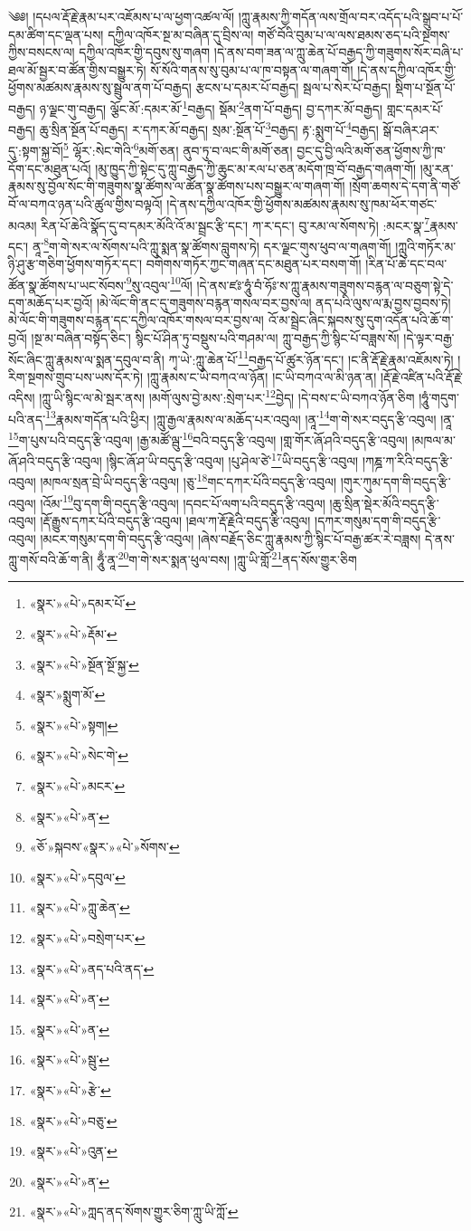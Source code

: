 ༄༅། །དཔལ་རྡོ་རྗེ་རྣམ་པར་འཇོམས་པ་ལ་ཕྱག་འཚལ་ལོ། །ཀླུ་རྣམས་ཀྱི་གདོན་ལས་གྲོལ་བར་འདོད་པའི་སྒྲུབ་པ་པོ་དམ་ཚིག་དང་ལྡན་པས། དཀྱིལ་འཁོར་སྔ་མ་བཞིན་དུ་བྲིས་ལ། གཙོ་བོའི་བུམ་པ་ལ་ལས་ཐམས་ཅད་པའི་སྔགས་ཀྱིས་བསངས་ལ། དཀྱིལ་འཁོར་གྱི་དབུས་སུ་གཞག །དེ་ནས་བག་ཟན་ལ་ཀླུ་ཆེན་པོ་བརྒྱད་ཀྱི་གཟུགས་སོར་བཞི་པ་ཐལ་མོ་སྦྱར་བ་ཚོན་གྱིས་བསྒྱུར་ཏེ། སོ་སོའི་གནས་སུ་བུམ་པ་ལ་ཁ་བསྟན་ལ་གཞག་གོ། །དེ་ནས་དཀྱིལ་འཁོར་གྱི་ཕྱོགས་མཚམས་རྣམས་སུ་སྦྲུལ་ནག་པོ་བརྒྱད། རྩངས་པ་དམར་པོ་བརྒྱད། སྦལ་པ་སེར་པོ་བརྒྱད། སྡིག་པ་སྔོན་པོ་བརྒྱད། ཉ་ལྗང་གུ་བརྒྱད། ལྕོང་མོ་:དམར་མོ་\footnote{«སྣར་»«པེ་»དམར་པོ་}བརྒྱད། སྡོམ་\footnote{«སྣར་»«པེ་»རྡོམ་}ནག་པོ་བརྒྱད། བྱ་དཀར་མོ་བརྒྱད། གླང་དམར་པོ་བརྒྱད། ཆུ་སྲིན་སྔོན་པོ་བརྒྱད། ར་དཀར་མོ་བརྒྱད། སྲམ་:སྔོན་པོ་\footnote{«སྣར་»«པེ་»སྔོན་སྔོ་སྐྱ་}བརྒྱད། རྟ་:སྨུག་པོ་\footnote{«སྣར་»སྨུག་མོ་}བརྒྱད། སྒོ་བཞིར་ཤར་དུ་:སྟག་སྐྱ་བོ།\footnote{«སྣར་»«པེ་»སྟག།} ལྷོར་:སེང་གེའི་\footnote{«སྣར་»«པེ་»སེང་གེ་}མགོ་ཅན། ནུབ་ཏུ་བ་ལང་གི་མགོ་ཅན། བྱང་དུ་བྱི་ལའི་མགོ་ཅན་ཕྱོགས་ཀྱི་ཁ་དོག་དང་མཐུན་པའོ། །མུ་ཁྱུད་ཀྱི་སྟེང་དུ་ཀླུ་བརྒྱད་ཀྱི་ཆུང་མ་རལ་པ་ཅན་མདོག་ཁྲ་བོ་བརྒྱད་གཞག་གོ། །མུ་རན་རྣམས་སུ་བྱོལ་སོང་གི་གཟུགས་སྣ་ཚོགས་ལ་ཚོན་སྣ་ཚོགས་པས་བསྒྱུར་ལ་གཞག་གོ། །སྲོག་ཆགས་དེ་དག་ནི་གཙོ་བོ་ལ་བཀའ་ཉན་པའི་ཚུལ་གྱིས་བལྟའོ། །དེ་ནས་དཀྱིལ་འཁོར་གྱི་ཕྱོགས་མཚམས་རྣམས་སུ་ཁམ་ཕོར་གཙང་མའམ། རིན་པོ་ཆེའི་སྣོད་དུ་བ་དམར་མོའི་འོ་མ་སྦྲང་རྩི་དང་། ཀ་ར་དང་། བུ་རམ་ལ་སོགས་ཏེ། :མངར་སྣ་\footnote{«སྣར་»«པེ་»མངར་}རྣམས་དང་། ནཱ་\footnote{«སྣར་»«པེ་»ན་}ག་གེ་སར་ལ་སོགས་པའི་ཀླུ་སྨན་སྣ་ཚོགས་བླུགས་ཏེ། དར་ལྗང་གུས་ཕུབ་ལ་གཞག་གོ། །ཀླུའི་གཏོར་མ་ཉི་ཤུ་རྩ་གཅིག་ཕྱོགས་གཏོར་དང་། བགེགས་གཏོར་ཀྱང་གཞན་དང་མཐུན་པར་བསག་གོ། །རིན་པོ་ཆེ་དང་བལ་ཚོན་སྣ་ཚོགས་པ་ཡང་སོབས་\footnote{«ཅོ་»སྐབས་«སྣར་»«པེ་»སོགས་}སུ་འབུལ་\footnote{«སྣར་»«པེ་»དབུལ་}ལོ། །དེ་ནས་ཛཿ་ཧཱུཾ་བཾ་ཧོཿ་ས་ཀླུ་རྣམས་གཟུགས་བརྙན་ལ་བཅུག་སྟེ་དེ་དག་མཆོད་པར་བྱའོ། །མེ་ལོང་གི་ནང་དུ་གཟུགས་བརྙན་གསལ་བར་བྱས་ལ། ནད་པའི་ལུས་ལ་རྨ་བྱས་བྱབས་ཏེ། མེ་ལོང་གི་གཟུགས་བརྙན་དང་དཀྱིལ་འཁོར་གསལ་བར་བྱས་ལ། འོ་མ་སྦྲེང་ཞིང་སྐབས་སུ་དུག་འདོན་པའི་ཆོ་ག་བྱའོ། །སྔ་མ་བཞིན་བསྟོད་ཅིང་། སྙིང་པོ་ཤིན་ཏུ་བསྡུས་པའི་གཤམ་ལ། ཀླུ་བརྒྱད་ཀྱི་སྙིང་པོ་བཟླས་སོ། །དེ་ལྟར་བརྒྱ་སོང་ཞིང་ཀླུ་རྣམས་ལ་སྨན་དབུལ་བ་ནི། ཀྭ་ཡེ་:ཀླུ་ཆེན་པོ་\footnote{«སྣར་»«པེ་»ཀླུ་ཆེན་}བརྒྱད་པོ་ཚུར་ཉོན་དང་། །ང་ནི་རྡོ་རྗེ་རྣམ་འཇོམས་ཏེ། །རིག་སྔགས་གྲུབ་པས་ཡས་དོར་ཏེ། །ཀླུ་རྣམས་ང་ཡི་བཀའ་ལ་ཉོན། །ང་ཡི་བཀའ་ལ་མི་ཉན་ན། །རྡོ་རྗེ་འཛིན་པའི་རྡོ་རྗེ་འདིས། །ཀླུ་ཡི་སྙིང་ལ་མེ་སྦར་ནས། །མགོ་ལུས་བྱེ་མས་:སྲེག་པར་\footnote{«སྣར་»«པེ་»བསྲེག་པར་}བྱེད། །དེ་བས་ང་ཡི་བཀའ་ཉོན་ཅིག །ཧཱུཾ་གདུག་པའི་ནད་\footnote{«སྣར་»«པེ་»ནད་པའི་ནད་}རྣམས་གདོན་པའི་ཕྱིར། །ཀླུ་རྒྱལ་རྣམས་ལ་མཆོད་པར་འབུལ། །ནཱ་\footnote{«སྣར་»«པེ་»ན་}ག་གེ་སར་བདུད་རྩི་འབུལ། །ནཱ་\footnote{«སྣར་»«པེ་»ན་}ག་པུས་པའི་བདུད་རྩི་འབུལ། །རྒྱ་མཚོ་ལྦུ་\footnote{«སྣར་»«པེ་»སྦུ་}བའི་བདུད་རྩི་འབུལ། །གླ་གོར་ཞོ་ཤའི་བདུད་རྩི་འབུལ། །མཁལ་མ་ཞོ་ཤའི་བདུད་རྩི་འབུལ། །སྙིང་ཞོ་ཤ་ཡི་བདུད་རྩི་འབུལ། །པུ་ཤེལ་ཙེ་\footnote{«སྣར་»«པེ་»རྩེ་}ཡི་བདུད་རྩི་འབུལ། །ཀཎྜ་ཀ་རིའི་བདུད་རྩི་འབུལ། །མཁལ་སྲན་བྲེ་ཡི་བདུད་རྩི་འབུལ། །ཅུ་\footnote{«སྣར་»«པེ་»བཅུ་}གང་དཀར་པོའི་བདུད་རྩི་འབུལ། །གུར་ཀུམ་དག་གི་བདུད་རྩི་འབུལ། །འོམ་\footnote{«སྣར་»«པེ་»འུན་}བུ་དག་གི་བདུད་རྩི་འབུལ། །དབང་པོ་ལག་པའི་བདུད་རྩི་འབུལ། །ཆུ་སྲིན་སྡེར་མོའི་བདུད་རྩི་འབུལ། །རྡོ་རྒྱུས་དཀར་པོའི་བདུད་རྩི་འབུལ། །ཐལ་ཀ་རྡོ་རྗེའི་བདུད་རྩི་འབུལ། །དཀར་གསུམ་དག་གི་བདུད་རྩི་འབུལ། །མངར་གསུམ་དག་གི་བདུད་རྩི་འབུལ། །ཞེས་བརྗོད་ཅིང་ཀླུ་རྣམས་ཀྱི་སྙིང་པོ་བརྒྱ་ཚར་རེ་བཟླས། དེ་ནས་ཀླུ་གསོ་བའི་ཆོ་ག་ནི། ཧཱུྃ་ནཱ་\footnote{«སྣར་»«པེ་»ན་}ག་གེ་སར་སྨན་ཕུལ་བས། །ཀླུ་ཡི་གློ་\footnote{«སྣར་»«པེ་»ཀླད་ནད་སོགས་གྱུར་ཅིག་ཀླུ་ཡི་ཀློ་}ནད་སོས་གྱུར་ཅིག 